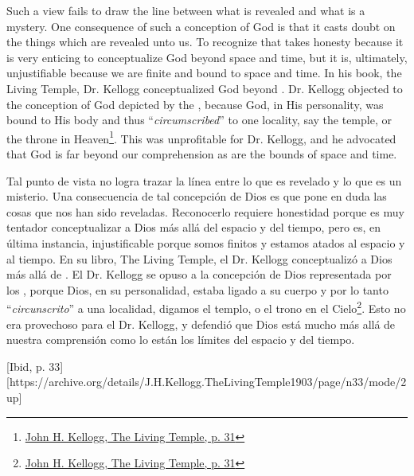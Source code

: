 Such a view fails to draw the line between what is revealed and what is a mystery. One consequence of such a conception of God is that it casts doubt on the things which are revealed unto us. To recognize that takes honesty because it is very enticing to conceptualize God beyond space and time, but it is, ultimately, unjustifiable because we are finite and bound to space and time. In his book, the Living Temple, Dr. Kellogg conceptualized God beyond . Dr. Kellogg objected to the conception of God depicted by the , because God, in His personality, was bound to His body and thus “\textit{circumscribed}” to one locality, say the temple, or the throne in Heaven\footnote{\href{https://archive.org/details/J.H.Kellogg.TheLivingTemple1903/page/n31/mode/2up}{John H. Kellogg, The Living Temple, p. 31}}. This was unprofitable for Dr. Kellogg, and he advocated that God is far beyond our comprehension as are the bounds of space and time.


Tal punto de vista no logra trazar la línea entre lo que es revelado y lo que es un misterio. Una consecuencia de tal concepción de Dios es que pone en duda las cosas que nos han sido reveladas. Reconocerlo requiere honestidad porque es muy tentador conceptualizar a Dios más allá del espacio y del tiempo, pero es, en última instancia, injustificable porque somos finitos y estamos atados al espacio y al tiempo. En su libro, The Living Temple, el Dr. Kellogg conceptualizó a Dios más allá de . El Dr. Kellogg se opuso a la concepción de Dios representada por los , porque Dios, en su personalidad, estaba ligado a su cuerpo y por lo tanto “\textit{circunscrito}” a una localidad, digamos el templo, o el trono en el Cielo\footnote{\href{https://archive.org/details/J.H.Kellogg.TheLivingTemple1903/page/n31/mode/2up}{John H. Kellogg, The Living Temple, p. 31}}. Esto no era provechoso para el Dr. Kellogg, y defendió que Dios está mucho más allá de nuestra comprensión como lo están los límites del espacio y del tiempo.


[Ibid, p. 33][https://archive.org/details/J.H.Kellogg.TheLivingTemple1903/page/n33/mode/2up]


